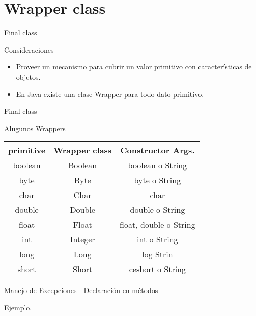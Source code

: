 \section{Wrapper  class}
\begin{frame}{Final  class}
\begin{block}{Consideraciones}
\begin{itemize}{}
\item Proveer un mecanismo para cubrir un valor primitivo con caracter\'isticas de objetos.
\item En Java existe una clase Wrapper para todo dato primitivo.
\end{itemize}
\end{block}
\end{frame}

\begin{frame}{Final  class}
\begin{block}{Alugunos Wrappers}
	\begin{center}
	\begin{tabular}{ | c c c | }
		\hline
		primitive & Wrapper class & Constructor Args.\\
		\hline
	 boolean & Boolean & boolean o String \\
	 \hline
	 byte & Byte &  byte o String \\
	 \hline
	 char & Char & char   \\
	 \hline
	 double & Double & double o String \\
	 \hline
	 float & Float & float, double o  String \\
	 \hline
	 int  & Integer & int o String \\
	 \hline
	 long & Long & log  Strin \\
	 \hline
	 short & Short & ceshort o String\\
	 \hline
	\end{tabular}
	\end{center}
\end{block}
\end{frame}



\begin{frame}{Manejo de Excepciones - Declaraci\'on en m\'etodos}
	\begin{block}{Ejemplo.}

\end{block}
\end{frame}
